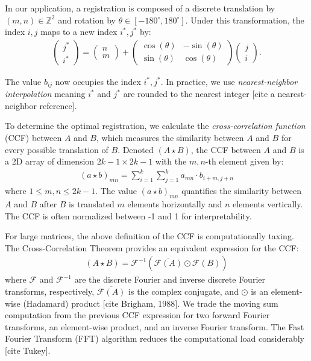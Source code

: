 \documentclass[
]{jdssv}
\begin{document}
In our application, a registration is composed of a discrete translation
by \((m,n) \in \mathbb{Z}^2\) and rotation by
\(\theta \in [-180^\circ,180^\circ]\). Under this transformation, the
index \(i,j\) maps to a new index \(i^*,j^*\) by: \begin{align*}
\begin{pmatrix} j^* \\ i^* \end{pmatrix} =
\begin{pmatrix} n \\ m \end{pmatrix} +
\begin{pmatrix} \cos(\theta) & -\sin(\theta) \\ \sin(\theta) & \cos(\theta) \end{pmatrix} \begin{pmatrix} j \\ i \end{pmatrix}.
\end{align*}

The value \(b_{ij}\) now occupies the index \(i^*, j^*\). In practice,
we use \emph{nearest-neighbor interpolation} meaning \(i^*\) and \(j^*\)
are rounded to the nearest integer {[}cite a nearest-neighbor
reference{]}.

To determine the optimal registration, we calculate the
\emph{cross-correlation function} (CCF) between \(A\) and \(B\), which
measures the similarity between \(A\) and \(B\) for every possible
translation of \(B\). Denoted \((A \star B)\), the CCF between \(A\) and
\(B\) is a 2D array of dimension \(2k - 1 \times 2k - 1\) with the
\(m,n\)-th element given by: \begin{align*}
(a \star b)_{mn} = \sum_{i=1}^k \sum_{j=1}^k a_{mn} \cdot b_{i + m, j + n}
\end{align*} where \(1 \leq m,n \leq 2k - 1\). The value
\((a \star b)_{mn}\) quantifies the similarity between \(A\) and \(B\)
after \(B\) is translated \(m\) elements horizontally and \(n\) elements
vertically. The CCF is often normalized between -1 and 1 for
interpretability.

For large matrices, the above definition of the CCF is computationally
taxing. The Cross-Correlation Theorem provides an equivalent expression
for the CCF: \begin{align*}
(A \star B) = \mathcal{F}^{-1}\left(\overline{\mathcal{F}(A)} \odot \mathcal{F}(B)\right)
\end{align*} where \(\mathcal{F}\) and \(\mathcal{F}^{-1}\) are the
discrete Fourier and inverse discrete Fourier transforms, respectively,
\(\overline{\mathcal{F}(A)}\) is the complex conjugate, and \(\odot\) is
an element-wise (Hadamard) product {[}cite Brigham, 1988{]}. We trade
the moving sum computation from the previous CCF expression for two
forward Fourier transforms, an element-wise product, and an inverse
Fourier transform. The Fast Fourier Transform (FFT) algorithm reduces
the computational load considerably {[}cite Tukey{]}.
\end{document}
